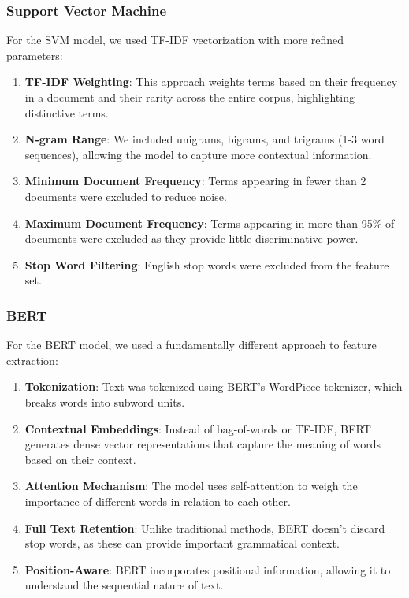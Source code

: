 \documentclass[conference]{IEEEtran}
\begin{document}
\subsubsection{Support Vector Machine}
For the SVM model, we used TF-IDF vectorization with more refined parameters:
\begin{enumerate}
\item \textbf{TF-IDF Weighting}: This approach weights terms based on their frequency in a document and their rarity across the entire corpus, highlighting distinctive terms.
\item \textbf{N-gram Range}: We included unigrams, bigrams, and trigrams (1-3 word sequences), allowing the model to capture more contextual information.
\item \textbf{Minimum Document Frequency}: Terms appearing in fewer than 2 documents were excluded to reduce noise.
\item \textbf{Maximum Document Frequency}: Terms appearing in more than 95\% of documents were excluded as they provide little discriminative power.
\item \textbf{Stop Word Filtering}: English stop words were excluded from the feature set.
\end{enumerate}

\subsubsection{BERT}
For the BERT model, we used a fundamentally different approach to feature extraction:
\begin{enumerate}
\item \textbf{Tokenization}: Text was tokenized using BERT's WordPiece tokenizer, which breaks words into subword units.
\item \textbf{Contextual Embeddings}: Instead of bag-of-words or TF-IDF, BERT generates dense vector representations that capture the meaning of words based on their context.
\item \textbf{Attention Mechanism}: The model uses self-attention to weigh the importance of different words in relation to each other.
\item \textbf{Full Text Retention}: Unlike traditional methods, BERT doesn't discard stop words, as these can provide important grammatical context.
\item \textbf{Position-Aware}: BERT incorporates positional information, allowing it to understand the sequential nature of text.
\end{enumerate}
\end{document}
